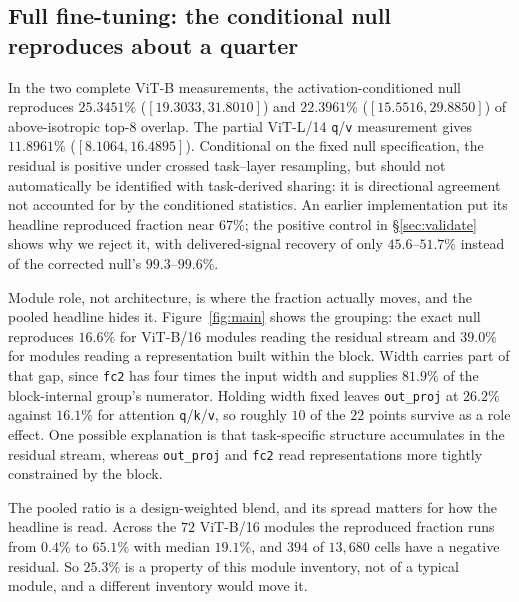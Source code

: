 \subsection{Full fine-tuning: the conditional null reproduces about a quarter}
\label{sec:fullft}

In the two complete ViT-B measurements, the activation-conditioned null reproduces
$25.3451\%$ ($[19.3033,31.8010]$) and $22.3961\%$ ($[15.5516,29.8850]$) of above-isotropic
top-$8$ overlap. The partial ViT-L/14 \texttt{q}/\texttt{v} measurement gives $11.8961\%$
($[8.1064,16.4895]$).
Conditional on the fixed
null specification, the residual is positive under crossed task--layer resampling, but
should not automatically be identified with
task-derived sharing: it is directional agreement not accounted for by the conditioned
statistics. An earlier implementation put its headline reproduced fraction near $67\%$; the positive
control in \S\ref{sec:validate} shows why we reject it, with delivered-signal recovery of only
$45.6$--$51.7\%$ instead of the corrected null's $99.3$--$99.6\%$.

Module role, not architecture, is where the fraction actually moves, and the pooled headline hides
it. Figure~\ref{fig:main} shows the grouping: the exact null reproduces $16.6\%$ for ViT-B/16
modules reading the residual stream and $39.0\%$ for modules reading a representation built within
the block. Width carries part of that gap, since \texttt{fc2} has four times the input width and
supplies $81.9\%$ of the block-internal group's numerator. Holding width fixed leaves
\texttt{out\_proj} at $26.2\%$ against $16.1\%$ for attention \texttt{q}/\texttt{k}/\texttt{v}, so
roughly $10$ of the $22$ points survive as a role effect. One possible explanation is that
task-specific structure accumulates in the residual stream, whereas \texttt{out\_proj} and
\texttt{fc2} read representations more tightly constrained by the block.

The pooled ratio is a design-weighted blend, and its spread matters for how the headline is read.
Across the $72$ ViT-B/16 modules the reproduced fraction runs from $0.4\%$ to $65.1\%$ with median
$19.1\%$, and $394$ of $13{,}680$ cells have a negative residual. So $25.3\%$ is a property of this
module inventory, not of a typical module, and a different inventory would move it.

